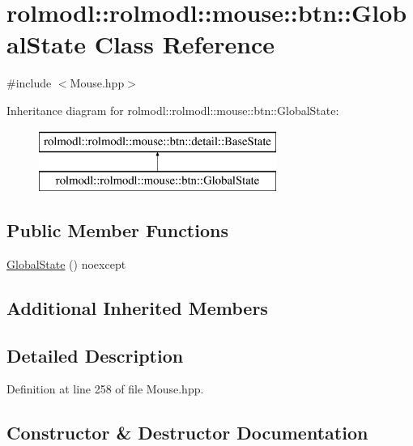 \hypertarget{classrolmodl_1_1rolmodl_1_1mouse_1_1btn_1_1_global_state}{}\section{rolmodl\+::rolmodl\+::mouse\+::btn\+::Global\+State Class Reference}
\label{classrolmodl_1_1rolmodl_1_1mouse_1_1btn_1_1_global_state}


{\ttfamily \#include $<$Mouse.\+hpp$>$}

Inheritance diagram for rolmodl\+::rolmodl\+::mouse\+::btn\+::Global\+State\+:\begin{figure}[H]
\begin{center}
\leavevmode
\includegraphics[height=2.000000cm]{classrolmodl_1_1rolmodl_1_1mouse_1_1btn_1_1_global_state}
\end{center}
\end{figure}
\subsection*{Public Member Functions}
\begin{DoxyCompactItemize}
\item 
\mbox{\hyperlink{classrolmodl_1_1rolmodl_1_1mouse_1_1btn_1_1_global_state_a2fc251dd539beb4709d09b4ec01ce3f6}{Global\+State}} () noexcept
\end{DoxyCompactItemize}
\subsection*{Additional Inherited Members}


\subsection{Detailed Description}


Definition at line 258 of file Mouse.\+hpp.



\subsection{Constructor \& Destructor Documentation}
\mbox{\label{classrolmodl_1_1rolmodl_1_1mouse_1_1btn_1_1_global_state_a2fc251dd539beb4709d09b4ec01ce3f6}} 
